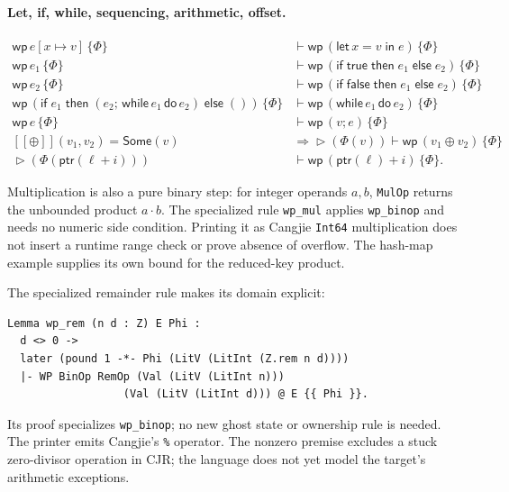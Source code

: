 \documentclass[11pt]{article}
\newcommand{\sem}[1]{[\![#1]\!]}
\newcommand{\Some}{\mathsf{Some}}
\newcommand{\Unit}{\mathsf{()}}
\newcommand{\True}{\mathsf{true}}
\newcommand{\False}{\mathsf{false}}
\newcommand{\later}{\mathop{\triangleright}}
\newcommand{\Wpre}{\mathsf{wp}}
\begin{document}
\paragraph{Let, if, while, sequencing, arithmetic, offset.}
\begin{align*}
\Wpre\,e[x\mapsto v]\,\{\Phi\}
  &\vdash \Wpre\,(\mathsf{let}\,x=v\;\mathsf{in}\;e)\,\{\Phi\}\\
\Wpre\,e_1\,\{\Phi\}
  &\vdash \Wpre\,(\mathsf{if}\;\True\;\mathsf{then}\;e_1\;\mathsf{else}\;e_2)\,\{\Phi\}\\
\Wpre\,e_2\,\{\Phi\}
  &\vdash \Wpre\,(\mathsf{if}\;\False\;\mathsf{then}\;e_1\;\mathsf{else}\;e_2)\,\{\Phi\}\\
\Wpre\,(\mathsf{if}\;e_1\;\mathsf{then}\;(e_2;\,\mathsf{while}\,e_1\,\mathsf{do}\,e_2)\;\mathsf{else}\;\Unit)\,\{\Phi\}
  &\vdash \Wpre\,(\mathsf{while}\,e_1\,\mathsf{do}\,e_2)\,\{\Phi\}\\
\Wpre\,e\,\{\Phi\}
  &\vdash \Wpre\,(v;e)\,\{\Phi\}\\
\sem{\oplus}(v_1,v_2)=\Some(v)
  &\Rightarrow
  \later(\Phi(v)) \vdash \Wpre\,(v_1\oplus v_2)\,\{\Phi\}\\
\later(\Phi(\mathsf{ptr}(\ell+i)))
  &\vdash \Wpre\,(\mathsf{ptr}(\ell)+i)\,\{\Phi\}.
\end{align*}

Multiplication is also a pure binary step: for integer operands $a,b$,
\texttt{MulOp} returns the unbounded product $a\cdot b$.
The specialized rule \texttt{wp\_mul} applies \texttt{wp\_binop} and needs no
numeric side condition. Printing it as Cangjie \texttt{Int64} multiplication
does not insert a runtime range check or prove absence of overflow.
The hash-map example supplies its own bound for the reduced-key product.

The specialized remainder rule makes its domain explicit:
\begin{lstlisting}
Lemma wp_rem (n d : Z) E Phi :
  d <> 0 ->
  later (pound 1 -*- Phi (LitV (LitInt (Z.rem n d))))
  |- WP BinOp RemOp (Val (LitV (LitInt n)))
                  (Val (LitV (LitInt d))) @ E {{ Phi }}.
\end{lstlisting}
Its proof specializes \texttt{wp\_binop}; no new ghost state or ownership
rule is needed. The printer emits Cangjie's \texttt{\%} operator.
The nonzero premise excludes a stuck zero-divisor operation in CJR;
the language does not yet model the target's arithmetic exceptions.
\end{document}
